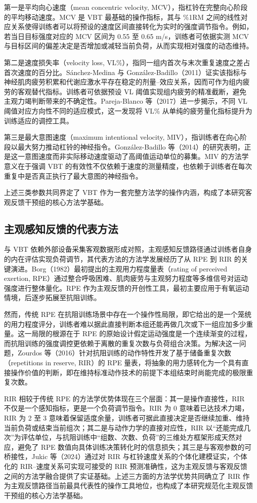\documentclass[UTF8,zihao=-4,twoside,openany]{ctexbook}
\begin{document}
第一是平均向心速度（mean concentric velocity, MCV），指杠铃在完整向心阶段的平均移动速度。MCV 是 VBT 最基础的操作指标，其与 \%1RM 之间的线性对应关系使得训练者可以将预设的速度区间直接转化为实时的强度调节指令。例如，若当日目标强度对应的 MCV 区间为 0.55 至 0.65 m/s，训练者可依据实测 MCV 与目标区间的偏差决定是否增加或减轻当前负荷，从而实现相对强度的动态维持。

第二是速度损失率（velocity loss, VL\%），指同一组内首次与末次重复速度之差占首次速度的百分比。Sánchez-Medina 与 González-Badillo（2011）证实该指标与神经肌肉疲劳积累和代谢应激水平存在稳定的剂量--效应关系，因而可作为组内疲劳的客观替代指标。训练者可依据预设 VL 阈值实现组内疲劳的精准截断，避免主观力竭判断带来的不确定性。Pareja-Blanco 等（2017）进一步揭示，不同 VL 阈值对应方向性不同的适应模式，这一发现将 VL\% 从单纯的疲劳量化指标提升为训练适应的调控工具。

第三是最大意图速度（maximum intentional velocity, MIV），指训练者在向心阶段以最大努力推动杠铃的神经指令。González-Badillo 等（2014）的研究表明，正是这一意图速度而非实际移动速度驱动了高阈值运动单位的募集。MIV 的方法学意义在于强调 VBT 的有效性不仅依赖于速度的测量精度，也依赖于训练者在每次重复中是否真正执行了最大意图的神经指令。

上述三类参数共同界定了 VBT 作为一套完整方法学的操作内涵，构成了本研究客观反馈干预组的核心方法学基础。

\subsection{主观感知反馈的代表方法}
与 VBT 依赖外部设备采集客观数据形成对照，主观感知反馈路径通过训练者自身的内在评估实现负荷调节，其代表方法的方法学发展经历了从 RPE 到 RIR 的关键演进。Borg（1982）最初提出的主观用力程度量表（rating of perceived exertion, RPE）通过整合呼吸困难、肌肉疲劳与主观努力程度等多维信号对运动强度进行整体量化。RPE 作为主观反馈的开创性工具，最初主要应用于有氧运动情境，后逐步拓展至抗阻训练。

然而，传统 RPE 在抗阻训练场景中存在一个操作性局限，即它给出的是一个笼统的用力程度评分，训练者难以据此直接判断本组还能再做几次或下一组应加多少重量。这一局限的根源在于 RPE 的原始设计假定运动强度是一个连续渐变的过程，而抗阻训练的强度调控更依赖于离散的重复次数与负荷组合决策。为解决这一问题，Zourdos 等（2016）针对抗阻训练的动作特性开发了基于储备重复次数（repetitions in reserve, RIR）的 RPE 量表，将抽象的用力感转化为一个具有直接操作价值的判断，即在维持标准动作技术的前提下本组结束时尚能完成的极限重复次数。

RIR 相较于传统 RPE 的方法学优势体现在三个层面：其一是操作直接性，RIR 不仅是一个感知指标，更是一个负荷调节指令。RIR 为 0 意味着已达技术力竭，RIR 为 2 至 3 意味着保留适度余量，训练者可据此直接决定是否继续加重、维持当前负荷或结束当前组次；其二是与动作力学的直接对应性，RIR 以“还能完成几次”为评估单位，与抗阻训练中“组数、次数、负荷”的三维处方框架形成天然对应，避免了 RPE 数值向具体训练决策转化时的信息损失；其三是与客观参数的可桥接性，Jukic 等（2024）通过对 RIR 与杠铃速度关系的个体化建模证实，个体化的 RIR--速度关系可实现可接受的 RIR 预测准确性，这为主观反馈与客观反馈之间的方法学融合提供了实证基础。上述三方面的方法学优势共同确立了 RIR 作为主观反馈路径当前最具代表性的操作工具地位，也构成了本研究规范化主观反馈干预组的核心方法学基础。
\end{document}
